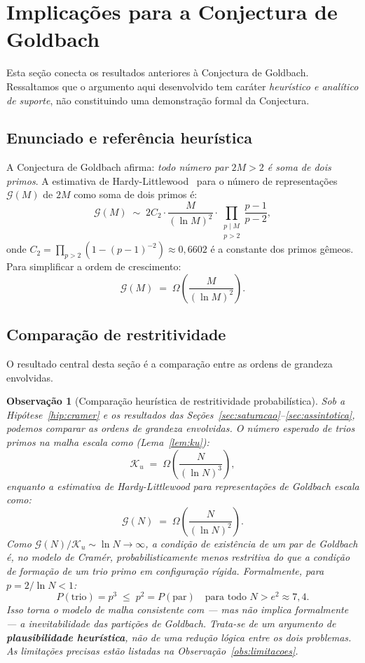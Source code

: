 \documentclass{article}
\newtheorem{remark}[proposition]{Observação}
\begin{document}
	\section{Implicações para a Conjectura de Goldbach}
	\label{sec:goldbach}
	
	Esta seção conecta os resultados anteriores à Conjectura de Goldbach.
	Ressaltamos que o argumento aqui desenvolvido tem caráter
	\emph{heurístico e analítico de suporte}, não constituindo
	uma demonstração formal da Conjectura.
	
	\subsection{Enunciado e referência heurística}
	
	A Conjectura de Goldbach afirma: \emph{todo número par $2M > 2$
		é soma de dois primos}. A estimativa de Hardy-Littlewood~\cite{hardylittlewood1923}
	para o número de representações $\mathcal{G}(M)$ de $2M$ como
	soma de dois primos é:
	\[
	\mathcal{G}(M)
	\;\sim\; 2C_2 \cdot \frac{M}{(\ln M)^2}
	\cdot \prod_{\substack{p \mid M \\ p > 2}}
	\frac{p-1}{p-2},
	\]
	onde $C_2 = \prod_{p>2}(1 - (p-1)^{-2}) \approx 0{,}6602$ é a
	constante dos primos gêmeos. Para simplificar a ordem de crescimento:
	\[
	\mathcal{G}(M) \;=\; \Omega\!\left(\frac{M}{(\ln M)^2}\right).
	\]
	
	\subsection{Comparação de restritividade}
	
	O resultado central desta seção é a comparação entre as ordens
	de grandeza envolvidas.
	
	\begin{remark}[Comparação heurística de restritividade probabilística]
		\label{cor:goldbach}
		Sob a Hipótese~\ref{hip:cramer} e os resultados das
		Seções~\ref{sec:saturacao}--\ref{sec:assintotica}, podemos
		comparar as ordens de grandeza envolvidas. O número esperado de
		trios primos na malha escala como (Lema~\ref{lem:ku}):
		\[
		\mathcal{K}_u \;=\; \Omega\!\left(\frac{N}{(\ln N)^3}\right),
		\]
		enquanto a estimativa de Hardy-Littlewood para representações
		de Goldbach escala como:
		\[
		\mathcal{G}(N) \;=\; \Omega\!\left(\frac{N}{(\ln N)^2}\right).
		\]
		Como $\mathcal{G}(N)/\mathcal{K}_u \sim \ln N \to \infty$,
		a condição de existência de um par de Goldbach é, no modelo
		de Cramér, probabilisticamente menos restritiva do que a
		condição de formação de um trio primo em configuração rígida.
		Formalmente, para $p = 2/\ln N < 1$:
		\[
		P(\text{trio}) = p^3 \;\leq\; p^2 = P(\text{par})
		\quad \text{para todo } N > e^2 \approx 7{,}4.
		\]
		Isso torna o modelo de malha \emph{consistente com} — mas não
		\emph{implica formalmente} — a inevitabilidade das partições
		de Goldbach. Trata-se de um argumento de \textbf{plausibilidade
			heurística}, não de uma redução lógica entre os dois problemas.
		As limitações precisas estão listadas na
		Observação~\ref{obs:limitacoes}.
	\end{remark}
	
\end{document}
